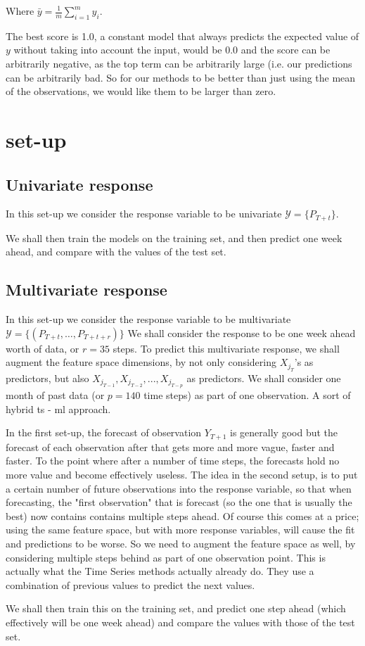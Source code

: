 Where $\bar{y} = \frac{1}{m} \sum_{i=1}^m y_i$. %

The best score is 1.0, a constant model that always predicts the expected value of $y$ without taking into account the input, would be 0.0 and the score can be arbitrarily negative, as the top term can be arbitrarily large (i.e. our predictions can be arbitrarily bad. So for our methods to be better than just using the mean of the observations, we would like them to be larger than zero.

\section{set-up}

\subsection{Univariate response}
In this set-up we consider the response variable to be univariate $\mathcal{Y}=\{P_{T+t}\}$.

We shall then train the models on the training set, and then predict one week ahead, and compare with the values of the test set.

\subsection{Multivariate response}
In this set-up we consider the response variable to be multivariate 
$\mathcal{Y}=\{ (P_{T+t},\dots,P_{T+t+r}) \}$
We shall consider the response to be one week ahead worth of data, or $r=35$ steps. To predict this multivariate response, we shall augment the feature space dimensions, by not only considering $X_{j_T}$'s as predictors, but also $X_{j_{T-1}},X_{j_{T-2}},...,X_{j_{T-p}}$ as predictors. We shall consider one month of past data (or $p=140$ time steps) as part of one observation. A sort of hybrid \acrlong{ts} - \acrlong{ml} approach.

In the first set-up, the forecast of observation $Y_{T+1}$ is generally good but the forecast of each observation after that gets more and more vague, faster and faster. To the point where after a number of time steps, the forecasts hold no more value and become effectively useless. The idea in the second setup, is to put a certain number of future observations into the response variable, so that when forecasting, the "first observation" that is forecast (so the one that is usually the best) now contains contains multiple steps ahead. Of course this comes at a price; using the same feature space, but with more response variables, will cause the fit and predictions to be worse. So we need to augment the feature space as well, by considering multiple steps behind as part of one observation point. This is actually what the Time Series methods actually already do. They use a combination of previous values to predict the next values.

We shall then train this on the training set, and predict one step ahead (which effectively will be one week ahead) and compare the values with those of the test set.
